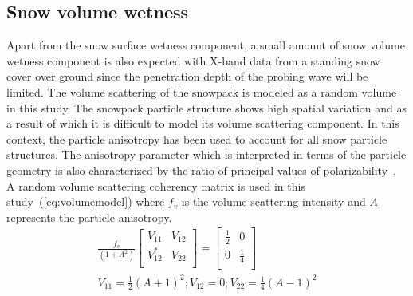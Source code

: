 \subsection{Snow volume wetness}
Apart from the snow surface wetness component, a small amount of snow volume wetness component is also expected with X-band data from a standing snow cover over ground since the penetration depth of the probing wave will be limited. The volume scattering of the snowpack is modeled as a random volume in this study. The snowpack particle structure shows high spatial variation and as a result of which it is difficult to model its volume scattering component. In this context, the particle anisotropy has been used to account for all snow particle structures. The anisotropy parameter which is interpreted in terms of the particle geometry is also characterized by the ratio of principal values of polarizability~\citep{cloude2009polarisation}. A random volume scattering coherency matrix is used in this study~(\ref{eq:volumemodel}) where $f_v$ is the volume scattering intensity and $A$ represents the particle anisotropy. 
\begin{equation}
\begin{split}
\frac{f_v}{(1+A^2)} \left[ \begin{array}{cc}
V_{11} & V_{12} \\
V_{12}^* & V_{22} \\
\end{array} \right]= \left[ \begin{array}{cc}
\frac{1}{2} & 0 \\
0 & \frac{1}{4} \\ 
\end{array} \right] \\
V_{11} = \frac{1}{2} (A+1)^2 ; V_{12} = 0 ;
V_{22} =\frac{1}{4}(A-1)^2 \\
\end{split}
\label{eq:volumemodel}
\end{equation}

